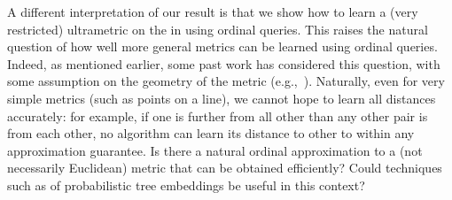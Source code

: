 A different interpretation of our result
is that we show how to learn
a (very restricted) ultrametric on the \elements in \AllElements
using ordinal queries.
This raises the natural question of how well more general metrics can
be learned using ordinal queries.
Indeed, as mentioned earlier,
some past work has considered this question,
with some assumption on the geometry of the metric
(e.g.,~\cite{jain-jamieson-nowak:2016:ordinal-embedding}).
Naturally, even for very simple metrics (such as points on a line),
we cannot hope to learn all distances accurately:
for example, if one \element is further from all other \elements
than any other pair is from each other, no algorithm can learn its distance
to other \elements to within any approximation guarantee.
Is there a natural ordinal approximation to
a (not necessarily Euclidean) metric that can be
obtained efficiently?
Could techniques such as
\cite{bartal:1996:probabilistic-approximations,%
bartal:1998:tree-metrics,%
fakcharoenphol-rao-talwar:2004:tree-metrics}
of probabilistic tree embeddings be useful in this context?

